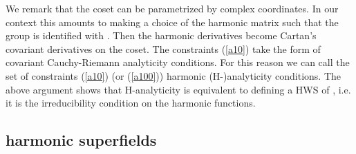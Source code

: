 \documentclass[a4paper,12pt]{article}
\begin{document}
We remark that the coset \coordHE{} can be 
parametrized by \coordHE{} complex coordinates. In our context 
this amounts to making a choice of the harmonic matrix \coordHE{} 
such that the group \coordHE{} is identified with 
\coordHE{}. Then the harmonic 
derivatives become Cartan's covariant derivatives on the coset. 
The constraints (\ref{a10}) take the form of covariant 
Cauchy-Riemann analyticity conditions. For this reason we can call 
the set of constraints (\ref{a10}) (or (\ref{a100})) harmonic 
(H-)analyticity conditions. The above argument shows that 
H-analyticity is equivalent to defining a HWS of \coordHE{}, 
i.e. it is the \coordHE{} irreducibility condition on the 
harmonic functions. 



\subsection{\coordHE{} harmonic superfields}\label{npqhsf}
\end{document}
